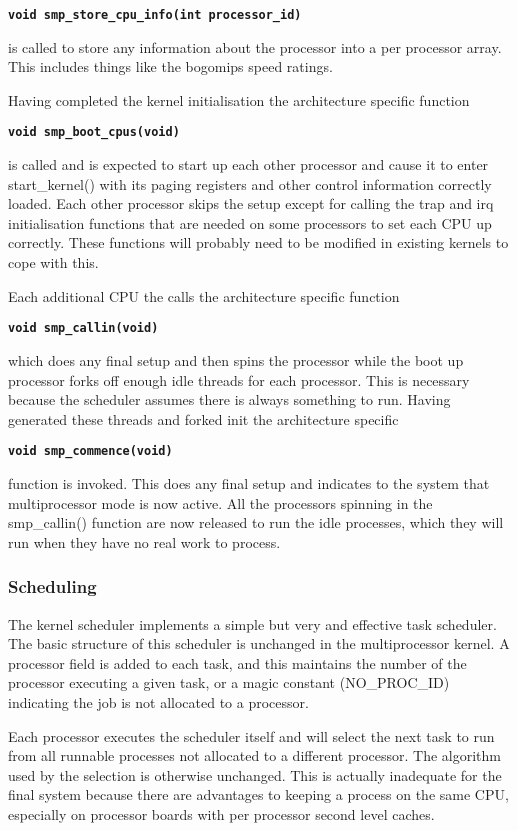 \documentclass[]{article}
\begin{document}
{\tt \bf{void smp\_store\_cpu\_info(int processor\_id) }}

is called to store any information about the processor into a per processor 
array. This includes things like the bogomips speed ratings.

Having completed the kernel initialisation the architecture specific 
function

{\tt \bf void smp\_boot\_cpus(void) }

is called and is expected to start up each other processor and cause it to 
enter start\_kernel() with its paging registers and other control 
information correctly loaded. Each other processor skips the setup except 
for calling the trap and irq initialisation functions that are needed on 
some processors to set each CPU up correctly.  These functions will 
probably need to be modified in existing kernels to cope with this.


Each additional CPU the calls the architecture specific function

{\tt \bf void smp\_callin(void)}

which does any final setup and then spins the processor while the boot 
up processor forks off enough idle threads for each processor. This is 
necessary because the scheduler assumes there is always something to run. 
Having generated these threads and forked init the architecture specific 

{\tt \bf void smp\_commence(void)}

function is invoked. This does any final setup and indicates to the system 
that multiprocessor mode is now active. All the processors spinning in the 
smp\_callin() function are now released to run the idle processes, which 
they will run when they have no real work to process.


\subsubsection{Scheduling}
The kernel scheduler implements a simple but very and effective task 
scheduler. The basic structure of this scheduler is unchanged in the 
multiprocessor kernel. A processor field is added to each task, and this 
maintains the number of the processor executing a given task, or a magic 
constant (NO\_PROC\_ID)  indicating the job is not allocated to a processor. 
	 
Each processor executes the scheduler itself and will select the next task 
to run from all runnable processes not allocated to a different processor. 
The algorithm used by the selection is otherwise unchanged. This is 
actually inadequate for the final system because there are advantages to 
keeping a process on the same CPU, especially on processor boards with per 
processor second level caches.
\end{document}
